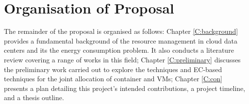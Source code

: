 \section{Organisation of Proposal}
The remainder of the proposal is organised as follows: Chapter \ref{C:background} provides a fundamental
background of  the resource management in cloud data centers and its the energy consumption problem. It also conducts a literature review covering a range of works in this field; Chapter \ref{C:preliminary} discusses the preliminary work carried out to explore the techniques and EC-based techniques for the joint allocation of container and VMs; Chapter \ref{C:con} presents a plan
detailing this project’s intended contributions, a project timeline, and a thesis outline.